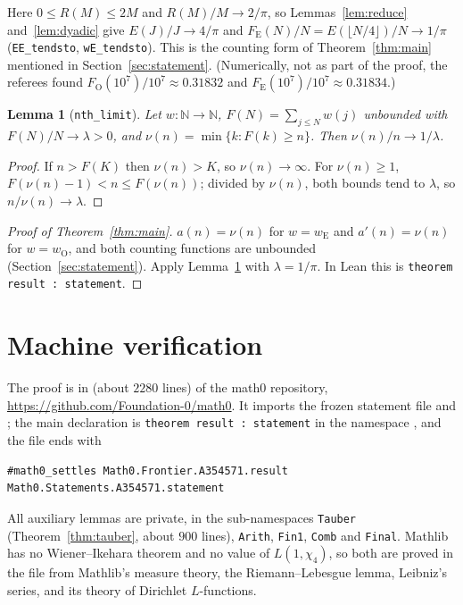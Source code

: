 \documentclass[11pt]{amsart}
\theoremstyle{plain}
\newtheorem{lemma}[theorem]{Lemma}
\theoremstyle{definition}
\newcommand{\code}[1]{\texttt{#1}}
\newcommand{\N}{\mathbb{N}}
\newcommand{\wE}{w_{\mathrm E}}
\newcommand{\wO}{w_{\mathrm O}}
\newcommand{\FE}{F_{\mathrm E}}
\newcommand{\FO}{F_{\mathrm O}}
\begin{document}
Here $0\le R(M)\le2M$ and $R(M)/M\to2/\pi$, so Lemmas~\ref{lem:reduce} and~\ref{lem:dyadic} give $E(J)/J\to4/\pi$ and $\FE(N)/N=E(\lfloor N/4\rfloor)/N\to1/\pi$ (\code{EE\_tendsto}, \code{wE\_tendsto}). This is the counting form of Theorem~\ref{thm:main} mentioned in Section~\ref{sec:statement}. (Numerically, not as part of the proof, the referees found $\FO(10^7)/10^7\approx0.31832$ and $\FE(10^7)/10^7\approx0.31834$.)

\begin{lemma}[\code{nth\_limit}]\label{lem:inverse}
Let $w:\N\to\N$, $F(N)=\sum_{j\le N}w(j)$ unbounded with $F(N)/N\to\lambda>0$, and $\nu(n)=\min\{k:F(k)\ge n\}$. Then $\nu(n)/n\to1/\lambda$.
\end{lemma}

\begin{proof}
If $n>F(K)$ then $\nu(n)>K$, so $\nu(n)\to\infty$. For $\nu(n)\ge1$, $F(\nu(n)-1)<n\le F(\nu(n))$; divided by $\nu(n)$, both bounds tend to $\lambda$, so $n/\nu(n)\to\lambda$.
\end{proof}

\begin{proof}[Proof of Theorem~\ref{thm:main}]
$a(n)=\nu(n)$ for $w=\wE$ and $a'(n)=\nu(n)$ for $w=\wO$, and both counting functions are unbounded (Section~\ref{sec:statement}). Apply Lemma~\ref{lem:inverse} with $\lambda=1/\pi$. In Lean this is \code{theorem result : statement}.
\end{proof}

\section{Machine verification}\label{sec:lean}

The proof is in  (about $2280$ lines) of the math0 repository, \url{https://github.com/Foundation-0/math0}. It imports the frozen statement file and ; the main declaration is \code{theorem result : statement} in the namespace , and the file ends with
\begin{lstlisting}
#math0_settles Math0.Frontier.A354571.result Math0.Statements.A354571.statement
\end{lstlisting}
All auxiliary lemmas are private, in the sub-namespaces \code{Tauber} (Theorem~\ref{thm:tauber}, about $900$ lines), \code{Arith}, \code{Fin1}, \code{Comb} and \code{Final}. Mathlib has no Wiener--Ikehara theorem and no value of $L(1,\chi_4)$, so both are proved in the file from Mathlib's measure theory, the Riemann--Lebesgue lemma, Leibniz's series, and its theory of Dirichlet $L$-functions.
\end{document}
